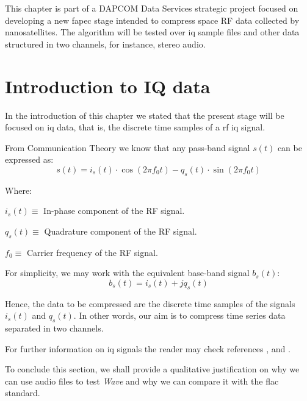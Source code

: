 This chapter is part of a DAPCOM Data Services strategic project focused on developing a new \acrshort*{fapec} stage intended to compress space RF data collected by nanosatellites. The algorithm will be tested over \acrshort{iq} sample files and other data structured in two channels, for instance, stereo audio.

\section{Introduction to IQ data}

In the introduction of this chapter we stated that the present stage will be focused on \acrshort{iq} data, that is, the discrete time samples of a \acrshort{rf} \acrshort{iq} signal.

From Communication Theory we know that any pass-band signal $s(t)$ can be expressed as:
\begin{equation}
s(t) = i_s(t) \cdot \cos(2\pi f_0 t) - q_s(t) \cdot \sin(2\pi f_0 t)
\end{equation}

Where:
\begin{description}
	\item $i_s(t) \equiv$ In-phase component of the RF signal.
	\item $q_s(t) \equiv$ Quadrature component of the RF signal.
	\item $f_0 \equiv$ Carrier frequency of the RF signal.
\end{description}

For simplicity, we may work with the equivalent base-band signal $b_s(t)$:
\begin{equation}
	b_s(t) = i_s(t) + j q_s(t)
\end{equation}

Hence, the data to be compressed are the discrete time samples of the signals $i_s(t)$ and $q_s(t)$. In other words, our aim is to compress time series data separated in two channels.

For further information on \acrshort{iq} signals the reader may check references \parencite{IQintro}, \parencite{carlson2010communication} and \parencite{ICOM}.

To conclude this section, we shall provide a qualitative justification on why we can use audio files to test \textit{Wave} and why we can compare it with the \acrshort{flac} standard.

